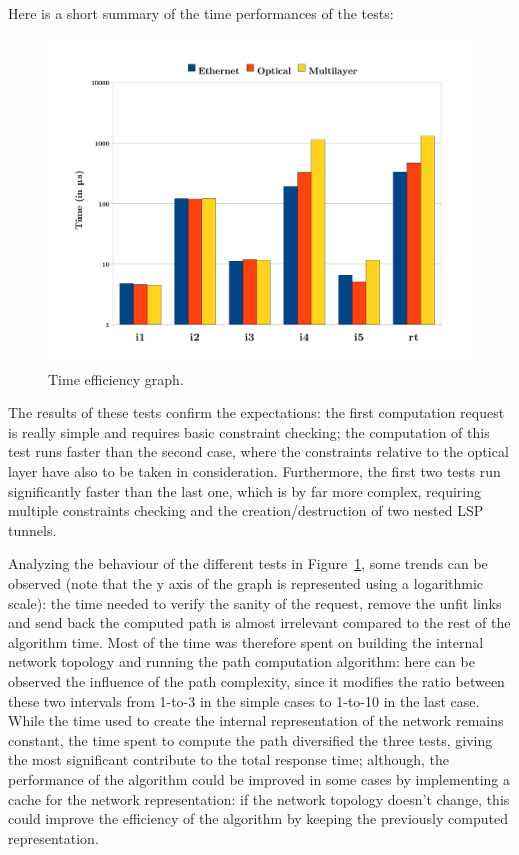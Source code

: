 \documentclass[10pt,a4paper]{report}
\begin{document}
Here is a short summary of the time performances of the tests:
\begin{figure}[!htbp]
  \begin{center}
    \includegraphics[width=1\textwidth]{img/time_graph}
    \caption[Algorithm time efficiency graph]{Time efficiency graph.}
    \label{fig:time_graph}
  \end{center}
\end{figure}

The results of these tests confirm the expectations: the first
computation request is really simple and requires basic constraint
checking; the computation of this test runs faster than the second
case, where the constraints relative to the optical layer have also to
be taken in consideration. Furthermore, the first two tests run
significantly faster than the last one, which is by far more complex,
requiring multiple constraints checking and the creation/destruction
of two nested LSP tunnels. 

Analyzing the behaviour of the different tests in
Figure~\ref{fig:time_graph}, some trends can be observed (note that
the y axis of the graph is represented using a logarithmic scale): the
time needed to verify the sanity of the request, remove the unfit
links and send back the computed path is almost irrelevant compared to
the rest of the algorithm time. Most of the time was therefore spent
on building the internal network topology and running the path
computation algorithm: here can be observed the influence of the path
complexity, since it modifies the ratio between these two intervals
from 1-to-3 in the simple cases to 1-to-10 in the last case. While the
time used to create the internal representation of the network remains
constant, the time spent to compute the path diversified the three
tests, giving the most significant contribute to the total response
time; although, the performance of the algorithm could be improved in
some cases by implementing a cache for the network representation: if
the network topology doesn't change, this could improve the efficiency
of the algorithm by keeping the previously computed representation.
\end{document}
